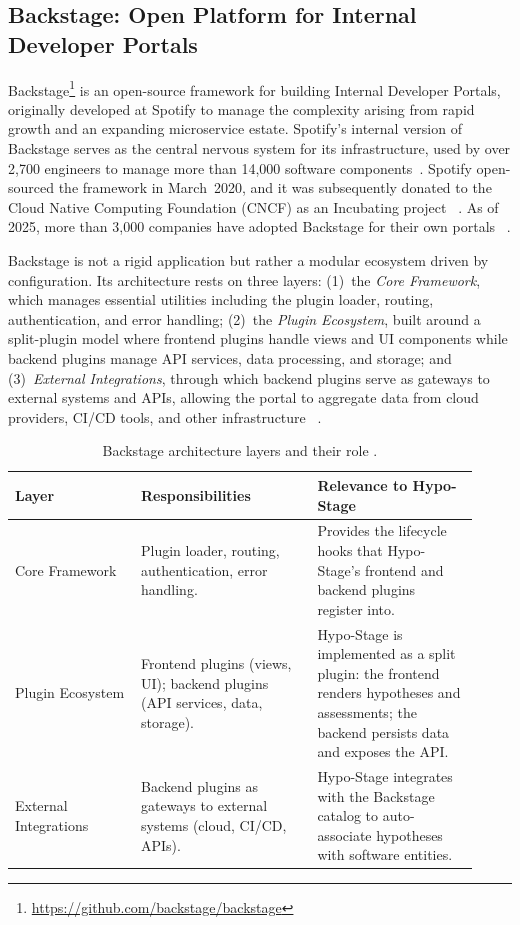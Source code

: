 \subsection{Backstage: Open Platform for Internal Developer Portals}
\label{subsec:backstage}

Backstage\footnote{\url{https://github.com/backstage/backstage}} is an open-source framework for building Internal Developer Portals,
originally developed at Spotify to manage the complexity arising from rapid growth and
an expanding microservice estate. Spotify's internal version of Backstage serves as the
central nervous system for its infrastructure, used by over 2,700 engineers to manage
more than 14,000 software components~\citep{backstage2024}. Spotify open-sourced the
framework in March~2020, and it was subsequently donated to the Cloud Native
Computing Foundation (CNCF) as an Incubating project ~\citep{backstage2024}. As of
2025, more than 3,000 companies have adopted Backstage for their own
portals ~\citep{backstage2024}.

Backstage is not a rigid application but rather a modular ecosystem driven by
configuration. Its architecture rests on three layers: (1)~the \emph{Core Framework},
which manages essential utilities including the plugin loader, routing, authentication,
and error handling; (2)~the \emph{Plugin Ecosystem}, built around a split-plugin model
where frontend plugins handle views and UI components while backend plugins manage
API services, data processing, and storage; and (3)~\emph{External Integrations}, through
which backend plugins serve as gateways to external systems and APIs, allowing the
portal to aggregate data from cloud providers, CI/CD tools, and other
infrastructure ~\citep{correa2025}.

\begin{table}[htbp]
\centering
\caption{Backstage architecture layers and their role \citep{correa2025}.}
\label{tab:backstage-layers}
\begin{tabular}{p{0.25\linewidth} p{0.35\linewidth} p{0.32\linewidth}}
\toprule
\textbf{Layer} & \textbf{Responsibilities} & \textbf{Relevance to Hypo-Stage} \\
\midrule
Core Framework & Plugin loader, routing, authentication, error handling. & Provides the lifecycle hooks that Hypo-Stage's frontend and backend plugins register into. \\
\midrule
Plugin Ecosystem & Frontend plugins (views, UI); backend plugins (API services, data, storage). & Hypo-Stage is implemented as a split plugin: the frontend renders hypotheses and assessments; the backend persists data and exposes the API. \\
\midrule
External Integrations & Backend plugins as gateways to external systems (cloud, CI/CD, APIs). & Hypo-Stage integrates with the Backstage catalog to auto-associate hypotheses with software entities. \\
\bottomrule
\end{tabular}
\end{table}

